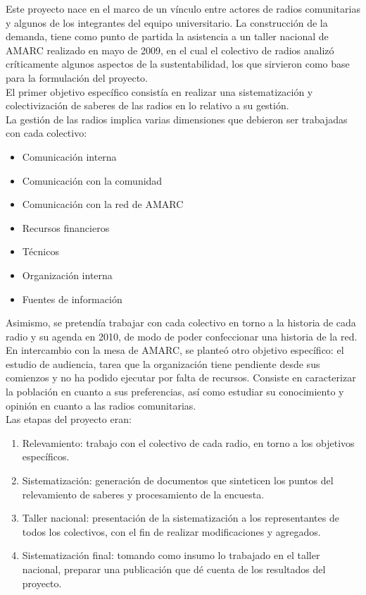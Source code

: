 Este proyecto nace en el marco de un vínculo entre actores de radios comunitarias y algunos de los integrantes del equipo universitario. La construcción de la demanda, tiene como punto de partida la asistencia a un taller nacional de AMARC realizado en mayo de 2009, en el cual  el colectivo de radios analizó críticamente algunos aspectos de la sustentabilidad, los que sirvieron como base para la formulación del proyecto.\\

El primer objetivo específico consistía en realizar una sistematización y colectivización de saberes de las radios en lo relativo a su gestión.\\

La gestión de las radios implica varias dimensiones que debieron ser trabajadas con cada colectivo:\\

\begin{itemize}
  \item Comunicación interna
  \item Comunicación con la comunidad
  \item Comunicación con la red de AMARC
  \item Recursos financieros
  \item Técnicos
  \item Organización interna
  \item Fuentes de información
\end{itemize}

Asimismo, se pretendía trabajar con cada colectivo en torno a la historia de cada radio y su agenda en 2010, de modo de poder confeccionar una historia de la red.\\

En intercambio con la mesa de AMARC, se planteó otro objetivo específico: el estudio de audiencia, tarea que la organización tiene pendiente desde sus comienzos y no ha podido ejecutar por falta de recursos. Consiste en caracterizar la población en cuanto a sus preferencias, así como estudiar su conocimiento y opinión en cuanto a las radios comunitarias.\\

Las etapas del proyecto eran:

\begin{enumerate}
  \item Relevamiento: trabajo con el colectivo de cada radio, en torno a los objetivos específicos.
  \item Sistematización: generación de documentos que sinteticen los puntos del relevamiento de saberes y procesamiento de la encuesta.
  \item Taller nacional: presentación de la sistematización a los representantes de todos los colectivos, con el fin de realizar modificaciones y agregados.
  \item Sistematización final: tomando como insumo lo trabajado en el taller nacional, preparar una publicación que dé cuenta de los resultados del proyecto.
\end{enumerate}


